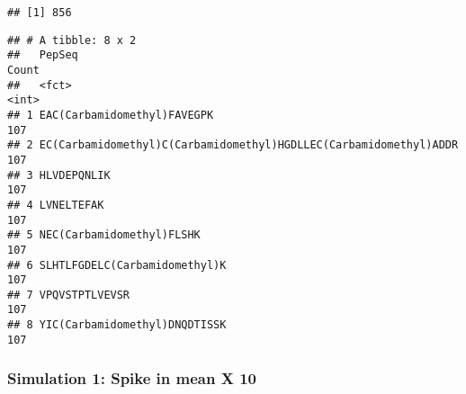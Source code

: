 \documentclass[]{article}
\newenvironment{Shaded}{\begin{snugshade}}{\end{snugshade}}
\newcommand{\KeywordTok}[1]{\textcolor[rgb]{0.13,0.29,0.53}{\textbf{#1}}}
\newcommand{\DataTypeTok}[1]{\textcolor[rgb]{0.13,0.29,0.53}{#1}}
\newcommand{\StringTok}[1]{\textcolor[rgb]{0.31,0.60,0.02}{#1}}
\newcommand{\OperatorTok}[1]{\textcolor[rgb]{0.81,0.36,0.00}{\textbf{#1}}}
\newcommand{\NormalTok}[1]{#1}
\begin{document}
\begin{verbatim}
## [1] 856
\end{verbatim}

\begin{Shaded}
\end{Shaded}

\begin{verbatim}
## # A tibble: 8 x 2
##   PepSeq                                                            Count
##   <fct>                                                             <int>
## 1 EAC(Carbamidomethyl)FAVEGPK                                         107
## 2 EC(Carbamidomethyl)C(Carbamidomethyl)HGDLLEC(Carbamidomethyl)ADDR   107
## 3 HLVDEPQNLIK                                                         107
## 4 LVNELTEFAK                                                          107
## 5 NEC(Carbamidomethyl)FLSHK                                           107
## 6 SLHTLFGDELC(Carbamidomethyl)K                                       107
## 7 VPQVSTPTLVEVSR                                                      107
## 8 YIC(Carbamidomethyl)DNQDTISSK                                       107
\end{verbatim}

\subsubsection{Simulation 1: Spike in mean X
10}\label{simulation-1-spike-in-mean-x-10}
\end{document}
